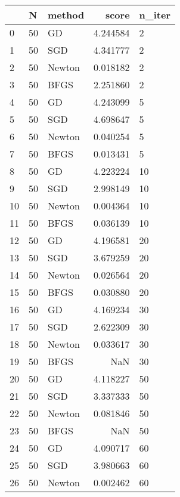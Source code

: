 \begin{tabular}{lllrl}
\toprule
{} &        N &  method &       score & n\_iter \\
\midrule
0   &       50 &      GD &    4.244584 &      2 \\
1   &       50 &     SGD &    4.341777 &      2 \\
2   &       50 &  Newton &    0.018182 &      2 \\
3   &       50 &    BFGS &    2.251860 &      2 \\
4   &       50 &      GD &    4.243099 &      5 \\
5   &       50 &     SGD &    4.698647 &      5 \\
6   &       50 &  Newton &    0.040254 &      5 \\
7   &       50 &    BFGS &    0.013431 &      5 \\
8   &       50 &      GD &    4.223224 &     10 \\
9   &       50 &     SGD &    2.998149 &     10 \\
10  &       50 &  Newton &    0.004364 &     10 \\
11  &       50 &    BFGS &    0.036139 &     10 \\
12  &       50 &      GD &    4.196581 &     20 \\
13  &       50 &     SGD &    3.679259 &     20 \\
14  &       50 &  Newton &    0.026564 &     20 \\
15  &       50 &    BFGS &    0.030880 &     20 \\
16  &       50 &      GD &    4.169234 &     30 \\
17  &       50 &     SGD &    2.622309 &     30 \\
18  &       50 &  Newton &    0.033617 &     30 \\
19  &       50 &    BFGS &         NaN &     30 \\
20  &       50 &      GD &    4.118227 &     50 \\
21  &       50 &     SGD &    3.337333 &     50 \\
22  &       50 &  Newton &    0.081846 &     50 \\
23  &       50 &    BFGS &         NaN &     50 \\
24  &       50 &      GD &    4.090717 &     60 \\
25  &       50 &     SGD &    3.980663 &     60 \\
26  &       50 &  Newton &    0.002462 &     60 \\

\end{tabular}
